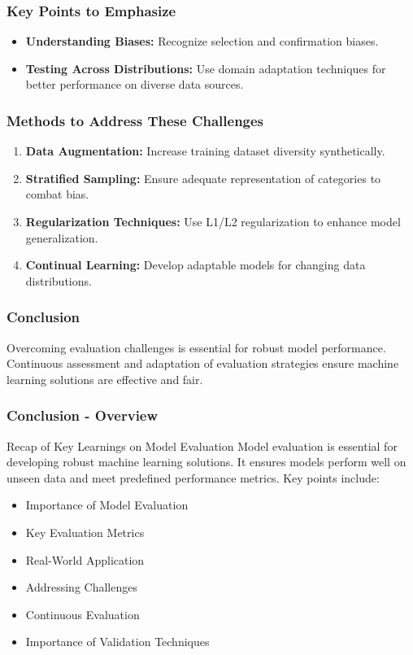 \documentclass[aspectratio=169]{beamer}
\begin{document}
\begin{frame}[fragile]
    \frametitle{Key Points to Emphasize}
    \begin{itemize}
        \item \textbf{Understanding Biases:} Recognize selection and confirmation biases.
        \item \textbf{Testing Across Distributions:} Use domain adaptation techniques for better performance on diverse data sources.
    \end{itemize}
\end{frame}

\begin{frame}[fragile]
    \frametitle{Methods to Address These Challenges}
    \begin{enumerate}
        \item \textbf{Data Augmentation:} Increase training dataset diversity synthetically.
        \item \textbf{Stratified Sampling:} Ensure adequate representation of categories to combat bias.
        \item \textbf{Regularization Techniques:} Use L1/L2 regularization to enhance model generalization.
        \item \textbf{Continual Learning:} Develop adaptable models for changing data distributions.
    \end{enumerate}
\end{frame}

\begin{frame}[fragile]
    \frametitle{Conclusion}
    Overcoming evaluation challenges is essential for robust model performance. Continuous assessment and adaptation of evaluation strategies ensure machine learning solutions are effective and fair. 
\end{frame}

\begin{frame}[fragile]
  \frametitle{Conclusion - Overview}
  \begin{block}{Recap of Key Learnings on Model Evaluation}
    Model evaluation is essential for developing robust machine learning solutions. It ensures models perform well on unseen data and meet predefined performance metrics. Key points include:
  \end{block}
  
  \begin{itemize}
    \item Importance of Model Evaluation
    \item Key Evaluation Metrics
    \item Real-World Application
    \item Addressing Challenges
    \item Continuous Evaluation
    \item Importance of Validation Techniques
  \end{itemize}
\end{frame}
\end{document}
